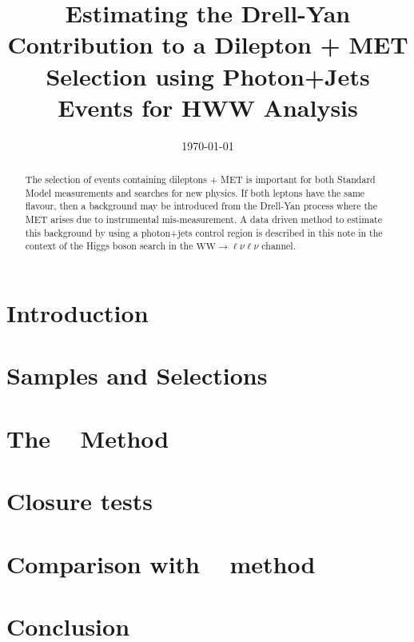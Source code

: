 \documentclass{cmspaper}
\begin{document}
\begin{titlepage}


  \date{\today}

  \title{Estimating the Drell-Yan Contribution to a Dilepton + MET Selection using Photon+Jets Events
  for HWW Analysis}
  
  

  \begin{abstract}
The selection of events containing dileptons + MET is important for both Standard Model measurements and searches for new physics. If both leptons have the same flavour, then a background may be introduced from the Drell-Yan process where the MET arises due to instrumental mis-measurement.  A data driven method to estimate this background by using a photon+jets control region is described in this note in the context of the Higgs boson search in the {$\mathrm{WW}\rightarrow\ell\nu\ell\nu$} channel.
   \end{abstract} 

\end{titlepage}
\tableofcontents
\listoftables
\listoffigures
\newpage 

\section{Introduction}
   \label{sec:introduction}
   
\section{Samples and Selections}
  \label{sec:datasets}
  
\section{The \zm~ Method}
   \label{sec:method}
   
\section{Closure tests}
   \label{sec:closure}
   
\section{Comparison with \routin~ method}
   \label{sec:comparison}
   
\section{Conclusion}
   
\clearpage

\end{document}
